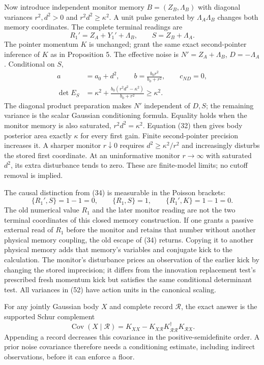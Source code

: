 \documentclass[11pt,a4paper]{article}
\begin{document}
Now introduce independent monitor memory \(B=(Z_B,\Lambda_B)\) with
diagonal variances \(r^2,d^2>0\) and \(r^2d^2\ge\kappa^2\). A unit pulse
generated by \(\Lambda_A\Lambda_B\) changes both memory coordinates. The
complete terminal readings are \[R_1'=Z_A+Y_1'+\Lambda_B,\qquad
S=Z_B+\Lambda_A.\tag{51}\] The pointer momentum \(K\) is unchanged;
grant the same exact second-pointer inference of \(K\) as in Proposition
5. The effective noise is \(N'=Z_A+\Lambda_B\), \(D=-\Lambda_A\).
Conditional on \(S\), \[\begin{aligned}
a&=a_0+d^2,\qquad b=\frac{b_0r^2}{b_0+r^2},\qquad c\!_{ND}=0,\\
\det E_S&=\kappa^2+
          \frac{b_0(r^2d^2-\kappa^2)}{b_0+r^2}\ge\kappa^2.
\end{aligned}\tag{52}\] The diagonal product preparation makes \(N'\)
independent of \(D,S\); the remaining variance is the scalar Gaussian
conditioning formula. Equality holds when the monitor memory is also
saturated, \(r^2d^2=\kappa^2\). Equation (32) then gives body posterior
area exactly \(\kappa\) for every first gain. Finite second-pointer
precision increases it. A sharper monitor \(r\downarrow0\) requires
\(d^2\ge\kappa^2/r^2\) and increasingly disturbs the stored first
coordinate. At an uninformative monitor \(r\to\infty\) with saturated
\(d^2\), its extra disturbance tends to zero. These are finite-model
limits; no cutoff removal is implied.

The causal distinction from (34) is measurable in the Poisson brackets:
\[\{R_1',S\}=1-1=0,\qquad
\{R_1,S\}=1,\qquad\{R_1',K\}=1-1=0.\tag{53}\] The old numerical value
\(R_1\) and the later monitor reading are not the two terminal
coordinates of this closed memory construction. If one grants a passive
external read of \(R_1\) before the monitor and retains that number
without another physical memory coupling, the old escape of (34)
returns. Copying it to another physical memory adds that memory's
variables and conjugate kick to the calculation. The monitor's
disturbance prices an observation of the earlier kick by changing the
stored imprecision; it differs from the innovation replacement test's
prescribed fresh momentum kick but satisfies the same conditional
determinant test. All variances in (52) have action units in the
canonical scaling.

For any jointly Gaussian body \(X\) and complete record \(\mathcal R\),
the exact answer is the supported Schur complement
\[\operatorname{Cov}(X\mid\mathcal R)
=K_{XX}-K_{X\mathcal R}K_{\mathcal R\mathcal R}^\dagger
 K_{\mathcal R X}.\tag{30}\] Appending a record decreases this
covariance in the positive-semidefinite order. A prior noise covariance
therefore needs a conditioning estimate, including indirect
observations, before it can enforce a floor.
\end{document}
